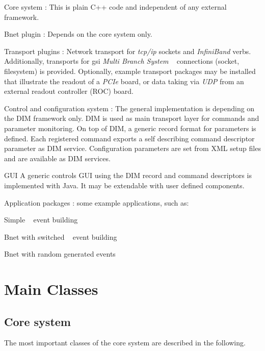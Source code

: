 \begin{compactdesc}
\item [Core system] : This is plain C++ code and independent of any external framework.
\item [Bnet plugin] : Depends on the core system only.
\item [Transport plugins] :  Network transport for  \textit{tcp/ip} sockets and \textit{InfiniBand} verbs. Additionally, 
transports for gsi \textit{Multi Branch System} \mbs~ connections (socket, filesystem) is provided. Optionally, example transport packages may be installed that
illustrate the readout of a \textit{PCIe} board, or data taking via \textit{UDP} from
an external readout controller (ROC) board.
\item [Control and configuration system]: The general implementation is depending on the DIM framework only.
DIM is used as main transport layer for commands and parameter monitoring.  On top of DIM, a generic record format for parameters is defined. Each registered command exports a self describing command descriptor  parameter as DIM service. Configuration parameters are set from XML setup files and are 
available as DIM services.      
\item  [GUI] A generic controls GUI using the DIM record and command descriptors is 
      implemented with Java. It may be extendable with user defined components.
\item[Application packages] : some example applications, such as: 
\begin{compactitem}[$\circ$]
\item  Simple \mbs~ event building
\item  Bnet with switched \mbs~ event building
\item  Bnet with random generated events
\end{compactitem}

      
\end{compactdesc}   






\section{Main Classes}
\subsection{Core system}
\label{prog_core_classes}
The most important classes of the \dabc core system are described in the following.

